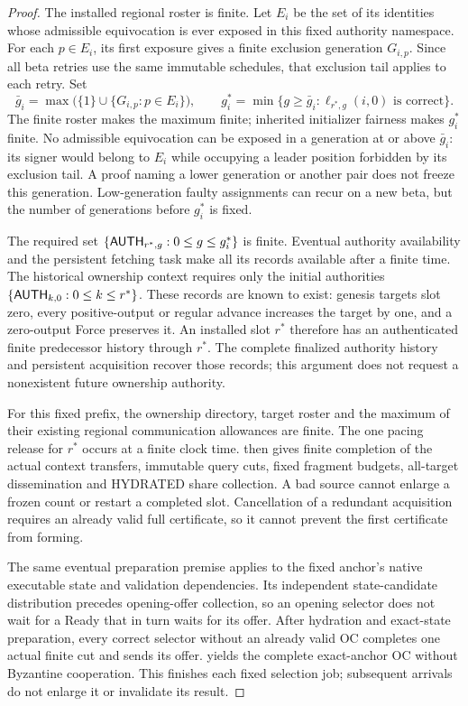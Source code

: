 \begin{proof}
The installed regional roster is finite. Let $E_i$ be the set of its
identities whose admissible equivocation is ever exposed in this fixed
authority namespace. For each $p\in E_i$, its first exposure gives a
finite exclusion generation $G_{i,p}$. Since all beta retries use the
same immutable schedules, that exclusion tail applies to each retry.
Set
\[
 \bar g_i=\max\bigl(\{1\}\cup\{G_{i,p}:p\in E_i\}\bigr),\qquad
 g_i^*=\min\{g\ge\bar g_i:
                   \ell_{r^*,g}(i,0)\text{ is correct}\}.
\]
The finite roster makes the maximum finite; inherited initializer
fairness makes $g_i^*$ finite. No admissible equivocation can be exposed
in a generation at or above $\bar g_i$: its signer would belong to
$E_i$ while occupying a leader position forbidden by its exclusion
tail. A proof naming a lower generation or another pair does not freeze
this generation. Low-generation faulty assignments can recur on a new
beta, but the number of generations before $g_i^*$ is fixed.

The required set $\{\mathsf{AUTH}_{r^*,g}:0\le g\le g_i^*\}$ is finite.
Eventual authority availability and the persistent fetching task make
all its records available after a finite time. The historical ownership
context requires only the initial authorities
$\{\mathsf{AUTH}_{k,0}:0\le k\le r^*\}$. These records are known to
exist: genesis targets slot zero, every positive-output or regular
advance increases the target by one, and a zero-output Force preserves
it. An installed slot $r^*$ therefore has an authenticated finite
predecessor history through $r^*$. The complete finalized authority
history and persistent acquisition recover those records; this argument
does not request a nonexistent future ownership authority.

For this fixed prefix, the ownership directory, target roster and the
maximum of their existing regional communication allowances are finite.
The one pacing release for $r^*$ occurs at a finite clock time.
 then gives finite completion of the
actual context transfers, immutable query cuts, fixed fragment budgets,
all-target dissemination and HYDRATED share collection. A bad source
cannot enlarge a frozen count or restart a completed slot. Cancellation
of a redundant acquisition requires an already valid full certificate,
so it cannot prevent the first certificate from forming.

The same eventual preparation premise applies to the fixed anchor's
native executable state and validation dependencies. Its independent
state-candidate distribution precedes opening-offer collection, so an
opening selector does not wait for a Ready that in turn waits for its
offer. After hydration and exact-state preparation, every correct
selector without an already valid OC completes one actual finite cut
and sends its offer.  yields the complete exact-anchor OC
without Byzantine cooperation. This finishes each fixed selection job;
subsequent arrivals do not enlarge it or invalidate its result.


\end{proof}
